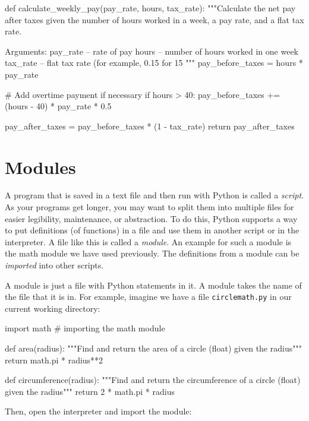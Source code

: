 \documentclass[11pt]{cselabheader}
\begin{document}
{\begin{itemize}
    \begin{python3code}
def calculate_weekly_pay(pay_rate, hours, tax_rate):
    """Calculate the net pay after taxes given the number of hours worked 
    in a week, a pay rate, and a flat tax rate.

    Arguments:
    pay_rate -- rate of pay
    hours -- number of hours worked in one week
    tax_rate -- flat tax rate (for example, 0.15 for 15%
    """
    pay_before_taxes = hours * pay_rate

    # Add overtime payment if necessary
    if hours > 40:
        pay_before_taxes += (hours - 40) * pay_rate * 0.5

    pay_after_taxes = pay_before_taxes * (1 - tax_rate)
    return pay_after_taxes
    \end{python3code}

\end{itemize}

\pagebreak
\section{Modules}
\label{sec:modules}

A program that is saved in a text file and then run with Python is called a
\emph{script}. As your programs get longer, you may want to split them into
multiple files for easier legibility, maintenance, or abstraction. To do this,
Python supports a way to put definitions (of functions) in a file and use them
in another script or in the interpreter. A file like this is called a
\emph{module}. An example for such a module is the math module we have used
previously. The definitions from a module can be \emph{imported} into other
scripts.

A module is just a file with Python statements in it. A module takes the name of
the file that it is in. For example, imagine we have a file
\texttt{circlemath.py} in our current working directory:

\begin{python3code}
import math # importing the math module

def area(radius):
    """Find and return the area of a circle (float) given the radius"""
    return math.pi * radius**2

def circumference(radius):
    """Find and return the circumference of a circle (float) given the radius"""
    return 2 * math.pi * radius
\end{python3code}

Then, open the interpreter and import the module:

}
\end{document}
